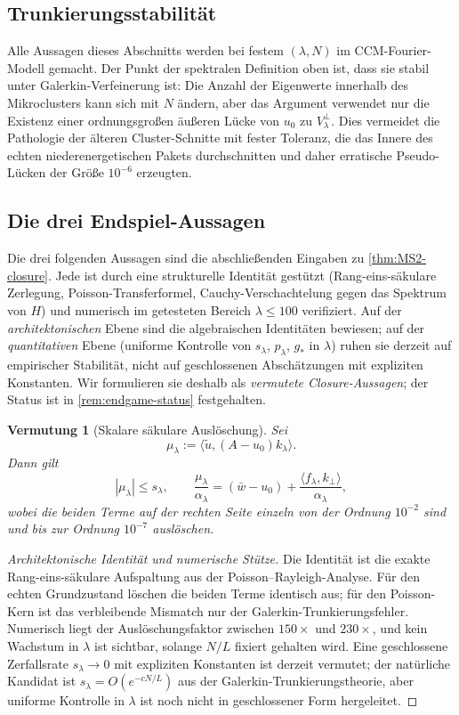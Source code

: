 \documentclass[12pt,a4paper]{article}
\newtheorem{conjecture}[theorem]{Vermutung}
\theoremstyle{definition}
\theoremstyle{remark}
\newcommand{\ip}[2]{\langle #1, #2 \rangle}
\newcommand{\utilde}{\tilde{u}}
\begin{document}
\subsection{Trunkierungsstabilität}

Alle Aussagen dieses Abschnitts werden bei festem $(\lambda,N)$ im
CCM-Fourier-Modell gemacht. Der Punkt der spektralen Definition oben ist,
dass sie stabil unter Galerkin-Verfeinerung ist: Die Anzahl der Eigenwerte
innerhalb des Mikroclusters kann sich mit $N$ ändern, aber das Argument
verwendet nur die Existenz einer ordnungsgroßen äußeren Lücke von $u_0$
zu $V_\lambda^\perp$.
Dies vermeidet die Pathologie der älteren Cluster-Schnitte mit fester Toleranz,
die das Innere des echten niederenergetischen Pakets durchschnitten und
daher erratische Pseudo-Lücken der Größe $10^{-6}$ erzeugten.

\subsection{Die drei Endspiel-Aussagen}

Die drei folgenden Aussagen sind die abschließenden Eingaben zu
\cref{thm:MS2-closure}. Jede ist durch eine strukturelle Identität
gestützt (Rang-eins-säkulare Zerlegung, Poisson-Transferformel,
Cauchy-Verschachtelung gegen das Spektrum von $H$) und numerisch im
getesteten Bereich $\lambda\le 100$ verifiziert. Auf der
\emph{architektonischen} Ebene sind die algebraischen Identitäten bewiesen;
auf der \emph{quantitativen} Ebene (uniforme Kontrolle von
$s_\lambda$, $p_\lambda$, $g_*$ in $\lambda$) ruhen sie derzeit auf
empirischer Stabilität, nicht auf geschlossenen Abschätzungen mit expliziten
Konstanten. Wir formulieren sie deshalb als \emph{vermutete
Closure-Aussagen}; der Status ist in \cref{rem:endgame-status} festgehalten.

\begin{conjecture}[Skalare säkulare Auslöschung]
\label{lem:scalar-secular}
Sei
\[
  \mu_\lambda := \ip{\utilde}{(A-u_0)k_\lambda}.
\]
Dann gilt
\[
  |\mu_\lambda| \le s_\lambda,
  \qquad
  \frac{\mu_\lambda}{\alpha_\lambda}
  =
  (\bar w-u_0)+\frac{\ip{f_\lambda}{k_\perp}}{\alpha_\lambda},
\]
wobei die beiden Terme auf der rechten Seite einzeln von der Ordnung $10^{-2}$ sind
und bis zur Ordnung $10^{-7}$ auslöschen.
\end{conjecture}

\begin{proof}[Architektonische Identität und numerische Stütze]
Die Identität ist die exakte Rang-eins-säkulare Aufspaltung aus der
Poisson--Rayleigh-Analyse. Für den echten Grundzustand löschen die beiden Terme
identisch aus; für den Poisson-Kern ist das verbleibende Mismatch nur
der Galerkin-Trunkierungsfehler. Numerisch liegt der Auslöschungsfaktor
zwischen $150\times$ und $230\times$, und kein Wachstum in $\lambda$ ist
sichtbar, solange $N/L$ fixiert gehalten wird. Eine geschlossene
Zerfallsrate $s_\lambda\to 0$ mit expliziten Konstanten ist derzeit
vermutet; der natürliche Kandidat ist $s_\lambda=O(e^{-cN/L})$ aus der
Galerkin-Trunkierungstheorie, aber uniforme Kontrolle in $\lambda$ ist noch
nicht in geschlossener Form hergeleitet.
\end{proof}
\end{document}
